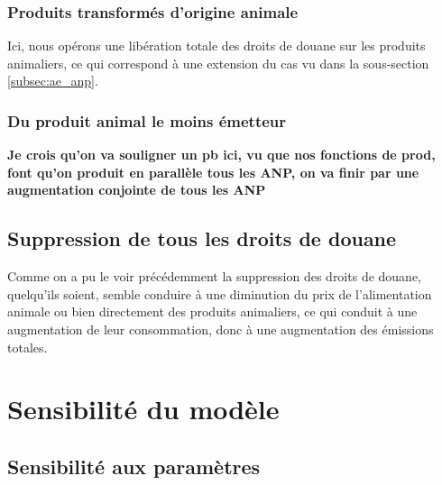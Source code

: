 \subsubsection{Produits transformés d'origine animale}

Ici, nous opérons une libération totale des droits de douane sur les produits animaliers, ce qui correspond à une extension du cas vu dans la sous-section \ref{subsec:ae_anp}.

\subsubsection{Du produit animal le moins émetteur}

\textbf{Je crois qu'on va souligner un pb ici, vu que nos fonctions de prod, font qu'on produit en parallèle tous les ANP, on va finir par une augmentation conjointe de tous les ANP}


\subsection{Suppression de tous les droits de douane}

Comme on a pu le voir précédemment la suppression des droits de douane, quelqu'ils soient, semble conduire à une diminution du prix de l'alimentation animale ou bien directement des produits animaliers, ce qui conduit à une augmentation de leur consommation, donc à une augmentation des émissions totales.


\section{Sensibilité du modèle}

\subsection{Sensibilité aux paramètres}

